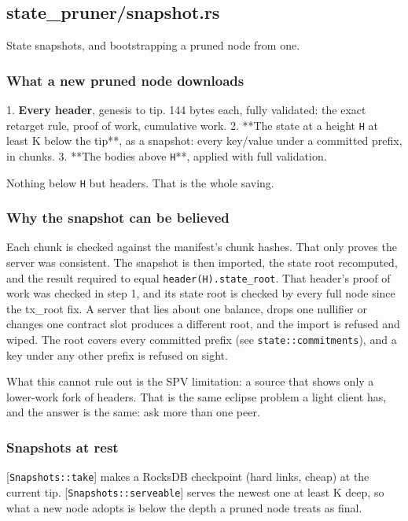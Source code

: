 \documentclass[11pt,a4paper]{article}
\begin{document}
\subsection{state\_pruner/snapshot.rs}
State snapshots, and bootstrapping a pruned node from one.

\subsubsection{What a new pruned node downloads}

1. \textbf{Every header}, genesis to tip. 144 bytes each, fully validated: the
   exact retarget rule, proof of work, cumulative work.
2. **The state at a height \texttt{H} at least K below the tip**, as a snapshot:
   every key/value under a committed prefix, in chunks.
3. **The bodies above \texttt{H}**, applied with full validation.

Nothing below \texttt{H} but headers. That is the whole saving.

\subsubsection{Why the snapshot can be believed}

Each chunk is checked against the manifest's chunk hashes. That only proves
the server was consistent. The snapshot is then imported, the state root
recomputed, and the result required to equal \texttt{header(H).state\_root}. That
header's proof of work was checked in step 1, and its state root is checked
by every full node since the tx\_root fix. A server that lies about one
balance, drops one nullifier or changes one contract slot produces a
different root, and the import is refused and wiped. The root covers every
committed prefix (see \texttt{state::commitments}), and a key under any other
prefix is refused on sight.

What this cannot rule out is the SPV limitation: a source that shows only
a lower-work fork of headers. That is the same eclipse problem a light
client has, and the answer is the same: ask more than one peer.

\subsubsection{Snapshots at rest}

[\texttt{Snapshots::take}] makes a RocksDB checkpoint (hard links, cheap) at the
current tip. [\texttt{Snapshots::serveable}] serves the newest one at least K deep,
so what a new node adopts is below the depth a pruned node treats as final.
\end{document}
